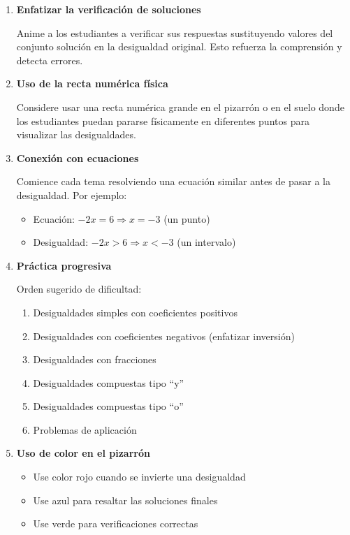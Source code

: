\begin{enumerate}
    \item \textbf{Enfatizar la verificación de soluciones}

    Anime a los estudiantes a verificar sus respuestas sustituyendo valores del conjunto solución en la desigualdad original. Esto refuerza la comprensión y detecta errores.

    \item \textbf{Uso de la recta numérica física}

    Considere usar una recta numérica grande en el pizarrón o en el suelo donde los estudiantes puedan pararse físicamente en diferentes puntos para visualizar las desigualdades.

    \item \textbf{Conexión con ecuaciones}

    Comience cada tema resolviendo una ecuación similar antes de pasar a la desigualdad. Por ejemplo:
    \begin{itemize}
        \item Ecuación: $-2x = 6 \Rightarrow x = -3$ (un punto)
        \item Desigualdad: $-2x > 6 \Rightarrow x < -3$ (un intervalo)
    \end{itemize}

    \item \textbf{Práctica progresiva}

    Orden sugerido de dificultad:
    \begin{enumerate}
        \item Desigualdades simples con coeficientes positivos
        \item Desigualdades con coeficientes negativos (enfatizar inversión)
        \item Desigualdades con fracciones
        \item Desigualdades compuestas tipo ``y''
        \item Desigualdades compuestas tipo ``o''
        \item Problemas de aplicación
    \end{enumerate}

    \item \textbf{Uso de color en el pizarrón}

    \begin{itemize}
        \item Use color rojo cuando se invierte una desigualdad
        \item Use azul para resaltar las soluciones finales
        \item Use verde para verificaciones correctas
    \end{itemize}
\end{enumerate}

